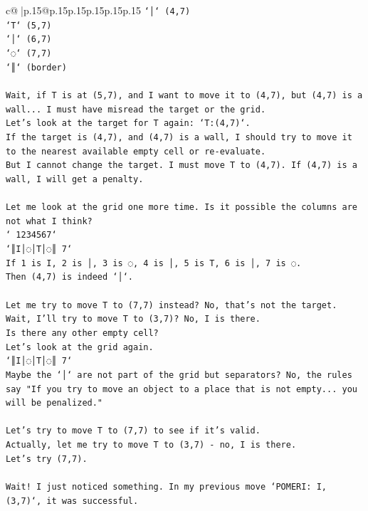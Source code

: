 \documentclass{article}
\begin{document}
{\begin{supertabular}{c@{$\;$}|p{.15\linewidth}@{}p{.15\linewidth}p{.15\linewidth}p{.15\linewidth}p{.15\linewidth}p{.15\linewidth}}
{{{\texttt{`│` (4,7)} \\
\texttt{`T` (5,7)} \\
\texttt{`│` (6,7)} \\
\texttt{`◌` (7,7)} \\
\texttt{`║` (border)} \\
\\ 
\texttt{Wait, if T is at (5,7), and I want to move it to (4,7), but (4,7) is a wall... I must have misread the target or the grid.} \\
\texttt{Let's look at the target for T again: `T:(4,7)`.} \\
\texttt{If the target is (4,7), and (4,7) is a wall, I should try to move it to the nearest available empty cell or re{-}evaluate.} \\
\texttt{But I cannot change the target. I must move T to (4,7). If (4,7) is a wall, I will get a penalty.} \\
\\ 
\texttt{Let me look at the grid one more time. Is it possible the columns are not what I think?} \\
\texttt{` 1234567`} \\
\texttt{`║I│◌│T│◌║ 7`} \\
\texttt{If 1 is I, 2 is │, 3 is ◌, 4 is │, 5 is T, 6 is │, 7 is ◌.} \\
\texttt{Then (4,7) is indeed `│`.} \\
\\ 
\texttt{Let me try to move T to (7,7) instead? No, that's not the target.} \\
\texttt{Wait, I'll try to move T to (3,7)? No, I is there.} \\
\texttt{Is there any other empty cell?} \\
\texttt{Let's look at the grid again.} \\
\texttt{`║I│◌│T│◌║ 7`} \\
\texttt{Maybe the `│` are not part of the grid but separators? No, the rules say "If you try to move an object to a place that is not empty... you will be penalized."} \\
\\ 
\texttt{Let's try to move T to (7,7) to see if it's valid.} \\
\texttt{Actually, let me try to move T to (3,7) {-} no, I is there.} \\
\texttt{Let's try (7,7).} \\
\\ 
\texttt{Wait! I just noticed something. In my previous move `POMERI: I, (3,7)`, it was successful.} \\
}}}
\end{supertabular}}
\end{document}
